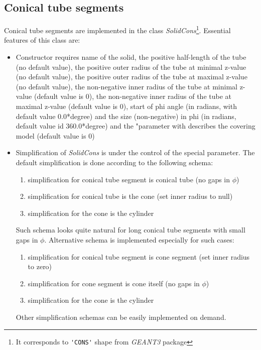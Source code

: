    \subsection{ Conical tube  segments } 
Conical tube  segments are implemented in the class 
{\it SolidCons}\footnote{ It corresponds to \verb+'CONS'+ shape from {\it GEANT3} package}. 
Essential features of this class are: 
\begin{itemize}
\item 
   Constructor requires name of the solid, the positive half-length of the tube (no default value), 
the positive outer radius of the tube at minimal z-value (no default value), 
the positive outer radius of the tube at maximal z-value (no default value), 
the non-negative inner radius of the tube at minimal z-value (default value is 0),
the non-negative inner radius of the tube at maximal z-value (default value is 0),
start of phi angle (in radians, with default value 0.0*degree)
and the size (non-negative) in phi (in radians, default value id 360.0*degree) 
and the "parameter with describes the covering model (default value is 0)
   \item 
Simplification of {\it SolidCons } is under the control of the special parameter.
 The default simplification is done according to the following schema:
 \begin{enumerate}
  \item simplification for conical tube  segment is conical tube  (no gaps in $\phi$)
  \item simplification for conical tube is the cone (set inner radius to null)  
  \item simplification for the cone is the cylinder
 \end{enumerate}
Such schema looks quite natural for long conical tube segments with small gaps in $\phi$. 
Alternative schema is implemented especially for such cases:
 \begin{enumerate}
  \item simplification for conical tube segment is cone segment (set inner radius to zero)
  \item simplification for cone segment is cone itself  (no gaps in $\phi$)   
  \item simplification for the cone is the cylinder
 \end{enumerate}
Other simplification schemas can be easily implemented on demand. 
\end{itemize} 

